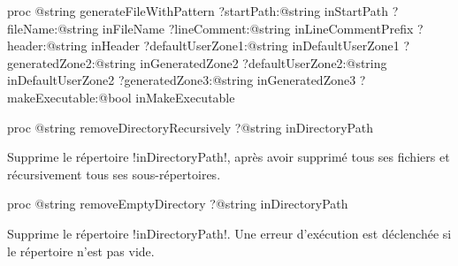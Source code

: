

\begin{galgasbox}
proc @string generateFileWithPattern
   ?startPath:@string inStartPath
   ?fileName:@string inFileName
   ?lineComment:@string inLineCommentPrefix
   ?header:@string inHeader
   ?defaultUserZone1:@string inDefaultUserZone1
   ?generatedZone2:@string inGeneratedZone2
   ?defaultUserZone2:@string inDefaultUserZone2
   ?generatedZone3:@string inGeneratedZone3
   ?makeExecutable:@bool inMakeExecutable
\end{galgasbox}








\begin{galgasbox}
proc @string removeDirectoryRecursively ?@string inDirectoryPath
\end{galgasbox}

Supprime le répertoire \ggs!inDirectoryPath!, après avoir supprimé tous ses fichiers et récursivement tous ses sous-répertoires.









\begin{galgasbox}
proc @string removeEmptyDirectory ?@string inDirectoryPath
\end{galgasbox}

Supprime le répertoire \ggs!inDirectoryPath!. Une erreur d'exécution est déclenchée si le répertoire n'est pas vide.


